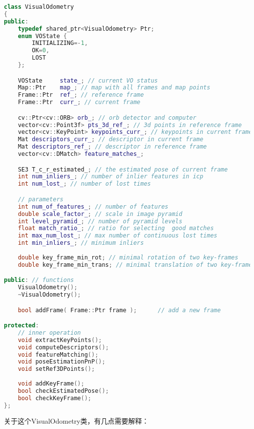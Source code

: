 \begin{lstlisting}[language=c++,caption=slambook/project/0.2/include/myslam/visual\_odometry.h]
class VisualOdometry
{
public:
	typedef shared_ptr<VisualOdometry> Ptr;
	enum VOState {
		INITIALIZING=-1,
		OK=0,
		LOST
	};

	VOState     state_; // current VO status
	Map::Ptr    map_; // map with all frames and map points
	Frame::Ptr  ref_; // reference frame 
	Frame::Ptr  curr_; // current frame 

	cv::Ptr<cv::ORB> orb_; // orb detector and computer 
	vector<cv::Point3f> pts_3d_ref_; // 3d points in reference frame 
	vector<cv::KeyPoint> keypoints_curr_; // keypoints in current frame
	Mat descriptors_curr_; // descriptor in current frame 
	Mat descriptors_ref_; // descriptor in reference frame 
	vector<cv::DMatch> feature_matches_;

	SE3 T_c_r_estimated_; // the estimated pose of current frame 
	int num_inliers_; // number of inlier features in icp
	int num_lost_; // number of lost times

	// parameters 
	int num_of_features_; // number of features
	double scale_factor_; // scale in image pyramid
	int level_pyramid_; // number of pyramid levels
	float match_ratio_; // ratio for selecting  good matches
	int max_num_lost_; // max number of continuous lost times
	int min_inliers_; // minimum inliers
	
	double key_frame_min_rot; // minimal rotation of two key-frames
	double key_frame_min_trans; // minimal translation of two key-frames

public: // functions 
	VisualOdometry();
	~VisualOdometry();

	bool addFrame( Frame::Ptr frame );      // add a new frame 

protected:  
	// inner operation 
	void extractKeyPoints();
	void computeDescriptors(); 
	void featureMatching();
	void poseEstimationPnP(); 
	void setRef3DPoints();
	
	void addKeyFrame();
	bool checkEstimatedPose(); 
	bool checkKeyFrame();
};
\end{lstlisting}

关于这个VisualOdometry类，有几点需要解释：

